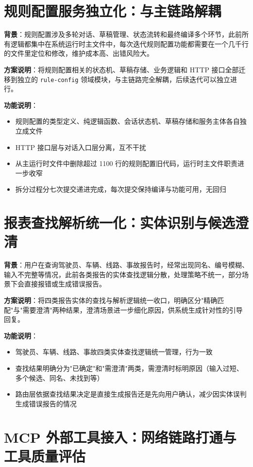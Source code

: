 \documentclass[UTF8]{ctexart}
\begin{document}
\section{规则配置服务独立化：与主链路解耦}

\textbf{背景}：规则配置涉及多轮对话、草稿管理、状态流转和最终编译多个环节，此前所有逻辑都集中在系统运行时主文件中，每次迭代规则配置功能都需要在一个几千行的文件里定位和修改，维护成本高、出错风险大。

\textbf{方案说明}：将规则配置相关的状态机、草稿存储、业务逻辑和 HTTP 接口全部迁移到独立的 \texttt{rule-config} 领域模块，与主链路完全解耦，后续迭代可以独立进行。

\textbf{功能说明}：
\begin{itemize}
\item 规则配置的类型定义、纯逻辑函数、会话状态机、草稿存储和服务主体各自独立成文件
\item HTTP 接口层与对话入口层分离，互不干扰
\item 从主运行时文件中删除超过 1100 行的规则配置旧代码，运行时主文件职责进一步收窄
\item 拆分过程分七次提交递进完成，每次提交保持编译与功能可用，无回归
\end{itemize}

\section{报表查找解析统一化：实体识别与候选澄清}

\textbf{背景}：用户在查询驾驶员、车辆、线路、事故报告时，经常出现同名、编号模糊、输入不完整等情况，此前各类报告的实体查找逻辑分散，处理策略不统一，部分场景下会直接报错或生成错误报告。

\textbf{方案说明}：将四类报告实体的查找与解析逻辑统一收口，明确区分"精确匹配"与"需要澄清"两种结果，澄清场景进一步细化原因，供系统生成针对性的引导回复。

\textbf{功能说明}：
\begin{itemize}
\item 驾驶员、车辆、线路、事故四类实体查找逻辑统一管理，行为一致
\item 查找结果明确分为"已确定"和"需澄清"两类，需澄清时标明原因（输入过短、多个候选、同名、未找到等）
\item 路由层依据查找结果决定是直接生成报告还是先向用户确认，减少因实体误判生成错误报告的情况
\end{itemize}

\section{MCP 外部工具接入：网络链路打通与工具质量评估}
\end{document}
